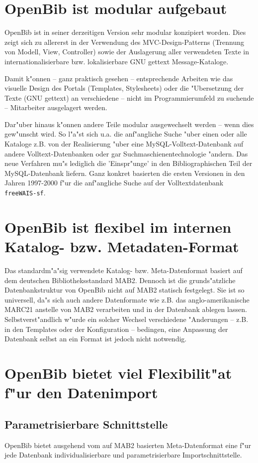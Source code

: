 \documentclass[11pt, twoside, a4paper, BCOR8mm, DIV12, bibtotoc,idxtotoc]{scrbook}
\begin{document}
\section{OpenBib ist modular aufgebaut}
OpenBib ist in seiner derzeitigen Version sehr modular konzipiert
worden. Dies zeigt sich zu allererst in der Verwendung des
MVC-Design-Patterns (Trennung von Modell, View, Controller) sowie der
Auslagerung aller verwendeten Texte in internationalisierbare bzw.
lokalisierbare GNU gettext Message-Kataloge.

Damit k"onnen -- ganz praktisch gesehen -- entsprechende Arbeiten wie
das visuelle Design des Portals (Templates, Stylesheets) oder die
"Ubersetzung der Texte (GNU gettext) an verschiedene -- nicht im
Programmierumfeld zu suchende -- Mitarbeiter ausgelagert werden.

Dar"uber hinaus k"onnen andere Teile modular ausgewechselt werden --
wenn dies gew"unscht wird. So l"a"st sich u.a. die anf"angliche Suche
"uber einen oder alle Kataloge z.B. von der Realisierung "uber eine
MySQL-Volltext-Datenbank auf andere Volltext-Datenbanken oder gar
Such\-ma\-schie\-nen\-tech\-no\-lo\-gie "andern. Das neue Verfahren
mu"s lediglich die 'Einspr"unge' in den Bibliographischen Teil der
MySQL-Datenbank liefern. Ganz konkret basierten die ersten Versionen
in den Jahren 1997-2000 f"ur die anf"angliche Suche auf der
Volltextdatenbank \texttt{freeWAIS-sf}.

\section{OpenBib ist flexibel im internen Katalog- bzw. Metadaten-Format}
Das standardm"a"sig verwendete Katalog- bzw. Meta-Datenformat basiert
auf dem deutschen Bibliotheksstandard MAB2. Dennoch ist die
grunds"atzliche Datenbankstruktur von OpenBib nicht auf MAB2 statisch
festgelegt. Sie ist so universell, da"s sich auch andere Datenformate
wie z.B. das anglo-amerikanische MARC21 anstelle von MAB2 verarbeiten
und in der Datenbank ablegen lassen. Selbstverst"andlich w"urde ein
solcher Wechsel verschiedene "Anderungen -- z.B. in den Templates oder
der Konfiguration -- bedingen, eine Anpassung der Datenbank selbst an
ein Format ist jedoch nicht notwendig.

\section{OpenBib bietet viel Flexibilit"at f"ur den Datenimport }
\subsection{Parametrisierbare Schnittstelle}
OpenBib bietet ausgehend vom auf MAB2 basierten Meta-Datenformat eine
f"ur jede Datenbank individualisierbare und parametrisierbare
Importschnittstelle.
\end{document}
